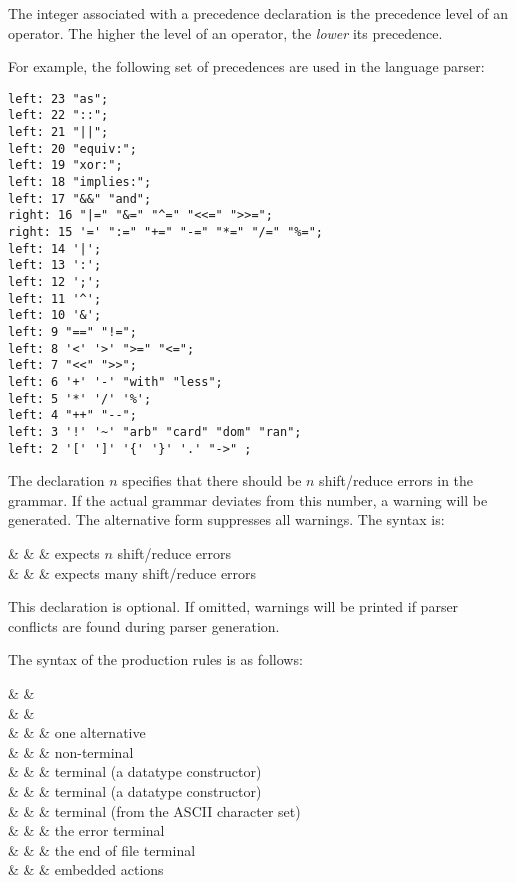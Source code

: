 The integer associated with a precedence declaration is the precedence
level of an operator.  The higher the level of an operator, the {\em lower} 
its precedence.

For example, the following set of precedences are used in the \Prop{}
language parser:
\begin{verbatim}
left: 23 "as";
left: 22 "::";
left: 21 "||";
left: 20 "equiv:";
left: 19 "xor:";
left: 18 "implies:";
left: 17 "&&" "and";
right: 16 "|=" "&=" "^=" "<<=" ">>=";
right: 15 '=' ":=" "+=" "-=" "*=" "/=" "%=";
left: 14 '|';
left: 13 ':';
left: 12 ';';
left: 11 '^';
left: 10 '&';
left: 9 "==" "!=";
left: 8 '<' '>' ">=" "<=";
left: 7 "<<" ">>";
left: 6 '+' '-' "with" "less";
left: 5 '*' '/' '%';
left: 4 "++" "--";
left: 3 '!' '~' "arb" "card" "dom" "ran";
left: 2 '[' ']' '{' '}' '.' "->" ;
\end{verbatim}


The declaration  $n$ specifies that there should be $n$
shift/reduce errors in the grammar.  If the actual grammar deviates
from this number, a warning will be generated.  The alternative
form  \T{\_} suppresses all warnings.  The syntax is:

\begin{syntax}
    & \IS &   \T{;}
    & expects $n$ shift/reduce errors \\
                     & \OR &  \T{\_} \T{;}
    & expects many shift/reduce errors \\
\end{syntax}

This declaration is optional.  If omitted, warnings will be printed
if parser conflicts are found during parser generation.



The syntax of the production rules is as follows: 

\begin{syntax}
 & \IS & 
  \Id \OPT{\TypeExp} \T{:} \\
  & & \quad {} \T{;} \\
  & \IS &  & one alternative \\
    & \IS & \Id        & non-terminal \\
    & \OR &    & terminal (a datatype constructor) \\
    & \OR &  & terminal (a datatype constructor) \\
    & \OR &    & terminal (from the ASCII character set) \\
    & \OR &       & the error terminal \\
    & \OR & \T{\$}     & the end of file terminal \\
    & \OR & \T{\{}  \T{\}} & embedded actions \\
\end{syntax}

